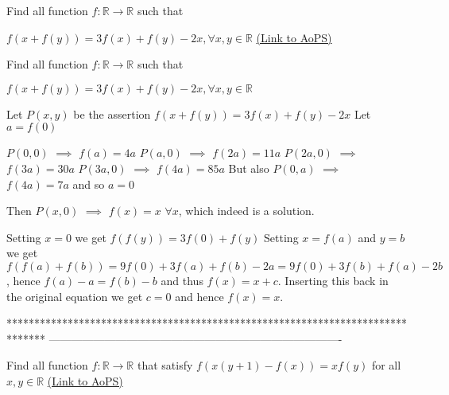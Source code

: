 \begin{problem}
	Find all function $f : \mathbb{R} \to \mathbb{R}$ such that 

$  f\left ( x+f\left ( y \right ) \right )=3f\left ( x \right )+f\left ( y \right )-2x                                                                                         ,\forall x,y\in \mathbb{R}$
	\flushright \href{https://artofproblemsolving.com/community/c6h616973}{(Link to AoPS)}
\end{problem}



\begin{solution}
	\begin{tcolorbox}Find all function $f : \mathbb{R} \to \mathbb{R}$ such that 

$  f\left ( x+f\left ( y \right ) \right )=3f\left ( x \right )+f\left ( y \right )-2x                                                                                         ,\forall x,y\in \mathbb{R}$\end{tcolorbox}
Let $P(x,y)$ be the assertion $f(x+f(y))=3f(x)+f(y)-2x$
Let $a=f(0)$

$P(0,0)$ $\implies$ $f(a)=4a$
$P(a,0)$ $\implies$ $f(2a)=11a$
$P(2a,0)$ $\implies$ $f(3a)=30a$
$P(3a,0)$ $\implies$ $f(4a)=85a$
But also $P(0,a)$ $\implies$ $f(4a)=7a$ and so $a=0$

Then $P(x,0)$ $\implies$ $\boxed{f(x)=x}$ $\forall x$, which indeed is a solution.
\end{solution}



\begin{solution}
	Setting $x=0$ we get $f(f(y))=3f(0)+f(y)$
Setting $x=f(a)$ and $y=b$ we get $f(f(a)+f(b))=9f(0)+3f(a)+f(b)-2a=9f(0)+3f(b)+f(a)-2b$, hence $f(a)-a=f(b)-b$ and thus $f(x)=x+c$. Inserting this back in the original equation we get $c=0$ and hence $f(x)=x$.
\end{solution}
*******************************************************************************
-------------------------------------------------------------------------------

\begin{problem}
	Find all function $f:\mathbb{R}\to\mathbb{R}$ that satisfy $f(x(y+1)-f(x))=xf(y)$ for all $x,y \in \mathbb{R}$
	\flushright \href{https://artofproblemsolving.com/community/c6h617014}{(Link to AoPS)}
\end{problem}




